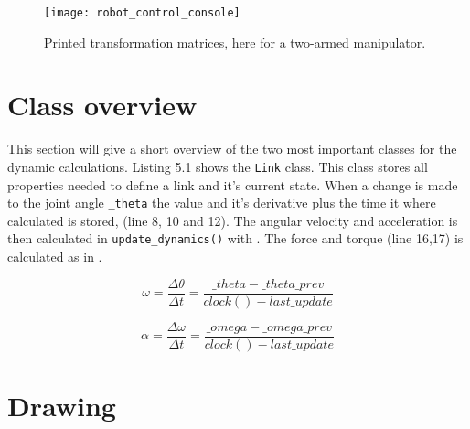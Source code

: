 \begin{figure}[h!]
    \centering
    \texttt{[image: robot\_control\_console]}
    \caption{Printed transformation matrices, here for a two-armed manipulator.}
    \label{console}
\end{figure}

\clearpage

\section{Class overview}

This section will give a short overview of the two most important classes for the dynamic calculations. Listing 5.1  shows the \texttt{Link} class. This class stores all properties needed to define a link and it's current state. When a change is made to the joint angle \texttt{\_theta} the value and it's derivative plus the time it where calculated is stored, (line 8, 10 and 12). The angular velocity and acceleration is then calculated in \texttt{update\_dynamics()} with . The force and torque (line 16,17) is calculated as in .


\label{Link}

\begin{equation}\label{omega_calc}
\omega = \frac{\Delta \theta}{\Delta t}=\frac{\_theta-\_theta\_prev}{clock()-last\_update}
\end{equation}

\begin{equation}\label{alpha_calc}
\alpha = \frac{\Delta \omega}{\Delta t}=\frac{\_omega-\_omega\_prev}{clock()-last\_update}
\end{equation}

\label{Robot}


\section{Drawing}


